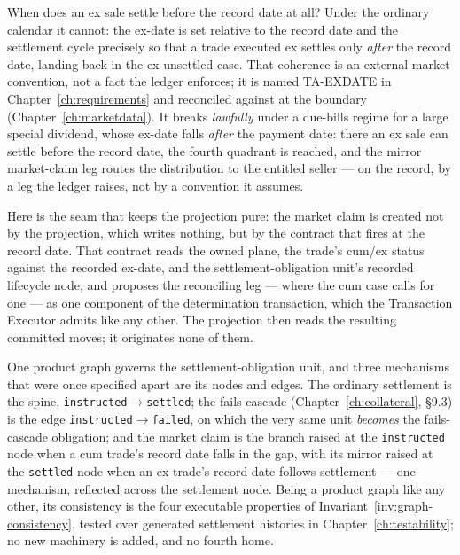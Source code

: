 When does an ex sale settle before the record date at all? Under the ordinary calendar
it cannot: the ex-date is set relative to the record date and the settlement cycle
precisely so that a trade executed ex settles only \emph{after} the record date,
landing back in the ex-unsettled case. That coherence is an external market convention,
not a fact the ledger enforces; it is named TA-EXDATE in Chapter~\ref{ch:requirements}
and reconciled against at the boundary (Chapter~\ref{ch:marketdata}). It breaks
\emph{lawfully} under a due-bills regime for a large special dividend, whose ex-date
falls \emph{after} the payment date: there an ex sale can settle before the record
date, the fourth quadrant is reached, and the mirror market-claim leg routes the
distribution to the entitled seller --- on the record, by a leg the ledger raises, not
by a convention it assumes.

Here is the seam that keeps the projection pure: the market claim is created not by the
projection, which writes nothing, but by the contract that fires at the record date.
That contract reads the owned plane, the trade's cum/ex status against the recorded
ex-date, and the settlement-obligation unit's recorded lifecycle node, and proposes the
reconciling leg --- where the cum case calls for one --- as one component of the
determination transaction, which the Transaction Executor admits like any other. The
projection then reads the resulting committed moves; it originates none of them.

One product graph governs the settlement-obligation unit, and three mechanisms that were
once specified apart are its nodes and edges. The ordinary settlement is the spine,
\texttt{instructed}$\to$\texttt{settled}; the fails cascade (Chapter~\ref{ch:collateral},
\S9.3) is the edge \texttt{instructed}$\to$\texttt{failed}, on which the very same unit
\emph{becomes} the fails-cascade obligation; and the market claim is the branch raised at
the \texttt{instructed} node when a cum trade's record date falls in the gap, with its
mirror raised at the \texttt{settled} node when an ex trade's record date follows
settlement --- one mechanism, reflected across the settlement node. Being a product graph
like any other, its consistency is the four executable properties of
Invariant~\ref{inv:graph-consistency}, tested over generated settlement histories in
Chapter~\ref{ch:testability}; no new machinery is added, and no fourth home.

